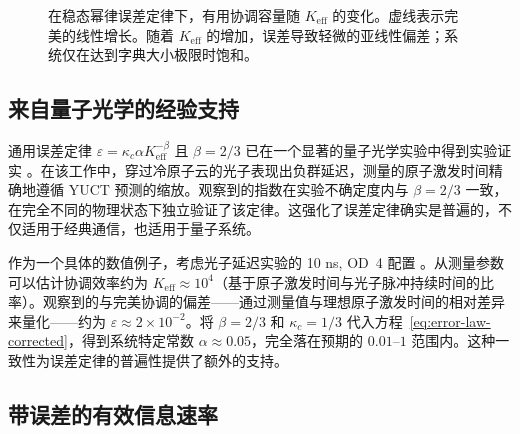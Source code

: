 \documentclass[12pt,a4paper]{article}
\theoremstyle{remark}
\newcommand{\Keff}{K_{\mathrm{eff}}}
\begin{document}
	\begin{figure}[htbp]
		\centering
		\caption{在稳态幂律误差定律下，有用协调容量随 \(K_{\mathrm{eff}}\) 的变化。虚线表示完美的线性增长。随着 \(K_{\mathrm{eff}}\) 的增加，误差导致轻微的亚线性偏差；系统仅在达到字典大小极限时饱和。}
		\label{fig:keff-phase}
	\end{figure}
	
	\subsection{来自量子光学的经验支持}
	通用误差定律 $\varepsilon = \kappa_c \alpha K_{\mathrm{eff}}^{-\beta}$ 且 $\beta = 2/3$ 已在一个显著的量子光学实验中得到实验证实 \cite{AppendixS}。在该工作中，穿过冷原子云的光子表现出负群延迟，测量的原子激发时间精确地遵循 YUCT 预测的缩放。观察到的指数在实验不确定度内与 $\beta = 2/3$ 一致，在完全不同的物理状态下独立验证了该定律。这强化了误差定律确实是普遍的，不仅适用于经典通信，也适用于量子系统。
	
	作为一个具体的数值例子，考虑光子延迟实验的 10 ns, OD~4 配置 \cite{AppendixS}。从测量参数可以估计协调效率约为 $\Keff \approx 10^4$（基于原子激发时间与光子脉冲持续时间的比率）。观察到的与完美协调的偏差——通过测量值与理想原子激发时间的相对差异来量化——约为 $\varepsilon \approx 2\times 10^{-2}$。将 $\beta=2/3$ 和 $\kappa_c=1/3$ 代入方程~\eqref{eq:error-law-corrected}，得到系统特定常数 $\alpha \approx 0.05$，完全落在预期的 $0.01$–$1$ 范围内。这种一致性为误差定律的普遍性提供了额外的支持。
	
	\subsection{带误差的有效信息速率}
	
\end{document}
